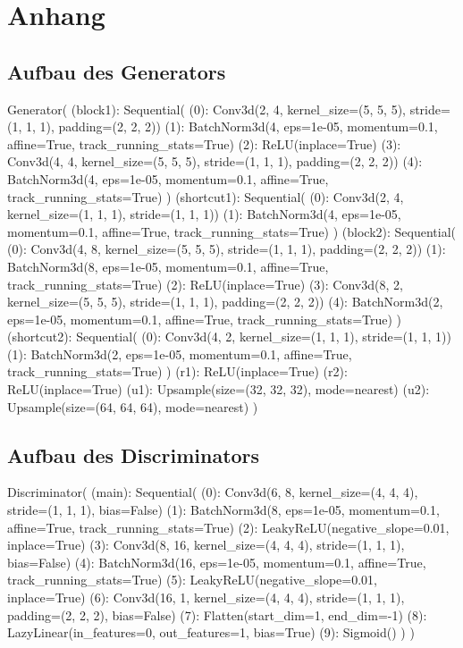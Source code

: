 \chapter*{Anhang}
\thispagestyle{plain}

\section{Aufbau des Generators}
\begin{python}
Generator(
(block1): Sequential(
(0): Conv3d(2, 4, kernel_size=(5, 5, 5), stride=(1, 1, 1), padding=(2, 2, 2))
(1): BatchNorm3d(4, eps=1e-05, momentum=0.1, affine=True, track_running_stats=True)
(2): ReLU(inplace=True)
(3): Conv3d(4, 4, kernel_size=(5, 5, 5), stride=(1, 1, 1), padding=(2, 2, 2))
(4): BatchNorm3d(4, eps=1e-05, momentum=0.1, affine=True, track_running_stats=True)
)
(shortcut1): Sequential(
(0): Conv3d(2, 4, kernel_size=(1, 1, 1), stride=(1, 1, 1))
(1): BatchNorm3d(4, eps=1e-05, momentum=0.1, affine=True, track_running_stats=True)
)
(block2): Sequential(
(0): Conv3d(4, 8, kernel_size=(5, 5, 5), stride=(1, 1, 1), padding=(2, 2, 2))
(1): BatchNorm3d(8, eps=1e-05, momentum=0.1, affine=True, track_running_stats=True)
(2): ReLU(inplace=True)
(3): Conv3d(8, 2, kernel_size=(5, 5, 5), stride=(1, 1, 1), padding=(2, 2, 2))
(4): BatchNorm3d(2, eps=1e-05, momentum=0.1, affine=True, track_running_stats=True)
)
(shortcut2): Sequential(
(0): Conv3d(4, 2, kernel_size=(1, 1, 1), stride=(1, 1, 1))
(1): BatchNorm3d(2, eps=1e-05, momentum=0.1, affine=True, track_running_stats=True)
)
(r1): ReLU(inplace=True)
(r2): ReLU(inplace=True)
(u1): Upsample(size=(32, 32, 32), mode=nearest)
(u2): Upsample(size=(64, 64, 64), mode=nearest)
)
\end{python}
\newpage
\thispagestyle{plain}
\section{Aufbau des Discriminators}
\begin{python}
Discriminator(
(main): Sequential(
(0): Conv3d(6, 8, kernel_size=(4, 4, 4), stride=(1, 1, 1), bias=False)
(1): BatchNorm3d(8, eps=1e-05, momentum=0.1, affine=True, track_running_stats=True)
(2): LeakyReLU(negative_slope=0.01, inplace=True)
(3): Conv3d(8, 16, kernel_size=(4, 4, 4), stride=(1, 1, 1), bias=False)
(4): BatchNorm3d(16, eps=1e-05, momentum=0.1, affine=True, track_running_stats=True)
(5): LeakyReLU(negative_slope=0.01, inplace=True)
(6): Conv3d(16, 1, kernel_size=(4, 4, 4), stride=(1, 1, 1), padding=(2, 2, 2), bias=False)
(7): Flatten(start_dim=1, end_dim=-1)
(8): LazyLinear(in_features=0, out_features=1, bias=True)
(9): Sigmoid()
)
)
\end{python}